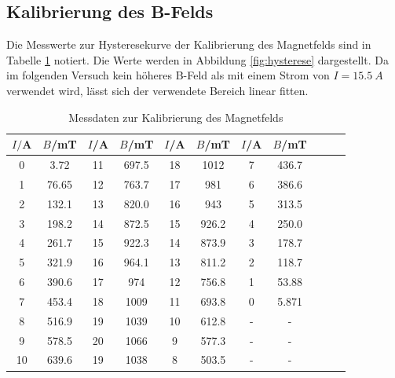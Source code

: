 \subsection{Kalibrierung des B-Felds}
Die Messwerte zur Hysteresekurve der Kalibrierung des Magnetfelds sind in Tabelle \ref{tab:hysterese} notiert.
Die Werte werden in Abbildung \ref{fig:hysterese} dargestellt.
Da im folgenden Versuch kein höheres B-Feld als mit einem Strom von $I=\SI{15.5}{A}$ verwendet wird, lässt sich der verwendete Bereich linear fitten.
%
%
\begin{table}[h!]
  \centering
  \caption{Messdaten zur Kalibrierung des Magnetfelds}
  \label{tab:hysterese}
  \begin{tabular}{c c c c c c c c c c c}
    \toprule
      $I/$A   &   $B$/mT  &  $I$/A   & $B$/mT &  $I$/A   & $B$/mT &  $I$/A   & $B$/mT\\
      \midrule
      0     &   3.72    &   11    &   697.5   &    18    &   1012      &    7     &   436.7    \\
      1     &   76.65   &   12    &   763.7   &    17    &   981       &    6     &   386.6    \\
      2     &   132.1   &   13    &   820.0   &    16    &   943       &    5     &   313.5    \\
      3     &   198.2   &   14    &   872.5   &    15    &   926.2     &    4     &   250.0    \\
      4     &   261.7   &   15    &   922.3   &    14    &   873.9     &    3     &   178.7    \\
      5     &   321.9   &   16    &   964.1   &    13    &   811.2     &    2     &   118.7    \\
      6     &   390.6   &   17    &   974     &    12    &   756.8     &    1     &   53.88    \\
      7     &   453.4   &   18    &   1009    &    11    &   693.8     &    0     &   5.871    \\
      8     &   516.9   &   19    &   1039    &    10    &   612.8     &    -     &      -     \\
      9     &   578.5   &   20    &   1066    &    9     &   577.3     &    -     &      -     \\
      10    &   639.6   &   19    &   1038    &    8     &   503.5     &    -     &      -     \\
    \bottomrule
  \end{tabular}
\end{table}
